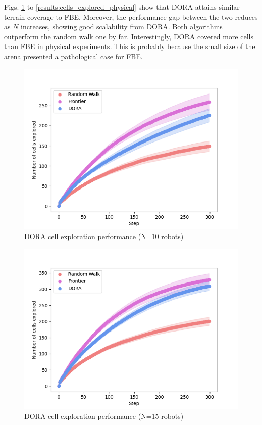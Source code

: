 Figs. \ref{results:explored10} to \ref{results:cells_explored_physical} show that \ac{DORA} attains similar terrain coverage to \ac{FBE}. Moreover, the performance gap between the two reduces as $N$ increases, showing good scalability from \ac{DORA}. Both algorithms outperform the random walk one by far. Interestingly, \ac{DORA} covered more cells than \ac{FBE} in physical experiments. This is probably because the small size of the arena presented a pathological case for \ac{FBE}. 

\begin{figure}
    \includegraphics[width=16cm]{figures/dora_explorer/explored_10.png}
        \caption[DORA cell exploration performance (N=10 robots)]{DORA cell exploration performance (N=10 robots)}
        \label{results:explored10}
\end{figure}

\begin{figure}
    \includegraphics[width=16cm]{figures/dora_explorer/explored_15.png}
        \caption[DORA cell exploration performance (N=15 robots)]{DORA cell exploration performance (N=15 robots)}
        \label{results:explored15}
\end{figure}

